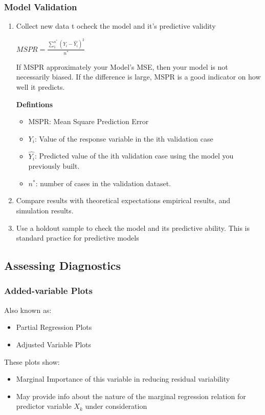 \documentclass[11pt]{article}
\begin{document}
\subsubsection{Model Validation}
\label{sec:org72d0046}
\begin{enumerate}
\item Collect new data t ocheck the model and it's predictive validity

\(MSPR = \frac{\sum_{1}^{n^*} (Y_i - \hat{Y_i})^2}{n^*}\)

If MSPR approximately your Model's MSE, then your model is not necessarily
biased.
If the difference is large, MSPR is a good indicator on how well it predicts.

\textbf{Defintions}
\begin{itemize}
\item MSPR: Mean Square Prediction Error
\item \(Y_i\): Value of the response variable in the ith validation case
\item \(\hat{Y_i}\): Predicted value of the ith validation case using the model you
previously built.
\item \(n^*\): number of cases in the validation dataset.
\end{itemize}

\item Compare results with theoretical expectations empirical results, and
simulation results.
\item Use a holdout sample to check the model and its predictive ability. This is
standard practice for predictive models
\end{enumerate}

\subsection{Assessing Diagnostics}
\label{sec:orgbf3cfba}
\subsubsection{Added-variable Plots}
\label{sec:orgd910980}
Also known as:
\begin{itemize}
\item Partial Regression Plots
\item Adjusted Variable Plots
\end{itemize}

These plots show:
\begin{itemize}
\item Marginal Importance of this variable in reducing residual variability
\item May provide info about the nature of the marginal regression relation for
predictor variable \(X_k\) under consideration
\end{itemize}
\end{document}
